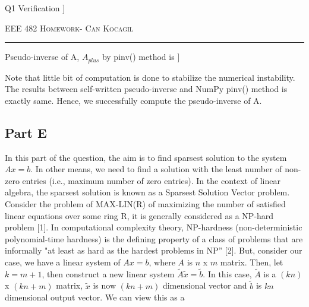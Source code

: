 \documentclass[12pt]{amsart}
\begin{document}
Q1 Verification \newline
 [[ True  True  True]     ] 



 
\newpage
{\scshape EEE 482} \hfill {\scshape \large  Homework-\relax} \hfill {\scshape Can Kocagil}
\smallskip
\hrule
\vspace{2mm}

Pseudo-inverse of A, $A_{plus}$ by pinv() method is \newline
 [[ 0.12693498  0.10835913 -0.05572755] \newline
 [-0.23529412 -0.17647059  0.17647059] \newline
 [-0.3622291  -0.28482972  0.23219814]  \newline
 [ 0.01857585  0.04024768  0.06501548]]


Note that little bit of computation is done to stabilize the numerical instability. The results between self-written pseudo-inverse and NumPy pinv() method is exactly same. Hence, we successfully compute the pseudo-inverse of A. \\

\subsection{Part E}
In this part of the question, the aim is to find sparsest solution to the system $Ax  = b$. In other means, we need to find a solution with the least number of non-zero entries (i.e., maximum number of zero entries). In the context of linear algebra, the sparsest solution is known as a Sparsest Solution Vector problem. Consider the problem of MAX-LIN(R) of maximizing the number of satisfied linear equations over some ring R, it is generally considered as a NP-hard problem [1].  In computational complexity theory, NP-hardness (non-deterministic polynomial-time hardness) is the defining property of a class of problems that are informally "at least as hard as the hardest problems in NP” [2]. But, consider our case, we have a linear system of $Ax = b$, where $A$ is $n$ x $m$ matrix. Then, let $k = m + 1$, then construct a new linear system $\tilde{A}\tilde{x} = \tilde{b}$. In this case, $\tilde{A}$ is a $(kn)$ x $(kn+m)$ matrix, $\tilde{x}$ is now $(kn + m)$ dimensional vector and $\tilde{b}$ is $kn$ dimensional output vector. We can view this as a
\end{document}
